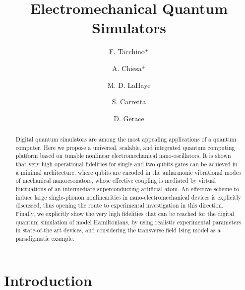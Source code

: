 \documentclass[aps,twocolumn,groupedaddress,superscriptaddress,floatfix,amsmath,amssymb,prb]{revtex4-1}
\begin{document}
\title{Electromechanical Quantum Simulators}
    
\author{F. Tacchino$^{+}$}
\author{A. Chiesa$^{+}$}
\author{M. D. LaHaye}
\author{S. Carretta}
\author{D. Gerace}

\begin{abstract} 
Digital quantum simulators are among the most appealing applications of a quantum computer. 
Here we propose a universal, scalable, and integrated quantum computing platform based on tunable 
nonlinear electromechanical nano-oscillators.
It is shown that very high operational fidelities for single and two qubits gates can be achieved in a minimal 
architecture, where qubits are encoded in the anharmonic vibrational modes of mechanical nanoresonators, 
whose effective coupling is mediated by virtual fluctuations of an intermediate superconducting artificial atom.
An effective scheme to induce large single-phonon nonlinearities in nano-electromechanical devices is explicitly discussed, thus opening
the route to experimental investigation in this direction.
Finally, we explicitly show the very high fidelities that can be reached for the digital quantum simulation of model Hamiltonians, 
by using realistic experimental parameters in state-of-the art devices, and considering the transverse field Ising model as a paradigmatic example. 
\end{abstract}

\maketitle

\section{Introduction}
\end{document}
